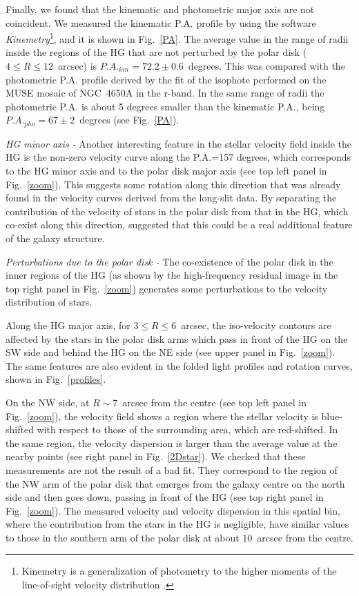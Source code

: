 \documentclass{aa}
\begin{document}
  Finally, we found that the kinematic and photometric major axis are
  not coincident.  We measured the kinematic P.A. profile by using the
  software {\it Kinemetry}\footnote{Kinemetry is a generalization of
    photometry to the higher moments of the line-of-sight velocity
    distribution \citep{Kraj2006}.}, and it is shown in
  Fig.~\ref{PA}. The average value in the range of radii inside the
  regions of the HG that are not perturbed by the polar disk
  ($4 \le R \le 12$~arcsec) is $P.A._{kin}=72.2 \pm 0.6$~degrees. This
  was compared with the photometric P.A. profile derived by the fit of
  the isophote performed on the MUSE mosaic of NGC~4650A in the r-band. In the same range of radii the photometric P.A. is about 5
  degrees smaller than the kinematic P.A., being
  $P.A._{pho}=67 \pm 2$~degrees (see Fig.~\ref{PA}).

 
{\it HG minor axis -} Another interesting feature in the stellar
velocity field inside the HG is the non-zero velocity curve along the
P.A.=157 degrees, which corresponds to the HG minor axis and to the
polar disk major axis (see top left panel in Fig.~\ref{zoom}). This
suggests some rotation along this direction that was  already found in the velocity curves derived from the long-slit data. 
By separating the contribution of the velocity of stars in the polar disk from that in the HG, which co-exist along this direction, \citet{Coccato2014} suggested that this could be a real additional feature of the galaxy structure.



{\it Perturbations due to the polar disk -} The co-existence of
the polar disk in the inner regions of the HG (as shown by the
high-frequency residual image in the top right panel in Fig.~\ref{zoom})
generates some perturbations to the velocity distribution of stars.

Along the HG major axis, for $3 \le R \le 6$~arcsec, the iso-velocity
contours are affected by the stars in the polar disk arms which pass in
front of the HG on the SW side and behind the HG on the NE side (see
upper panel in Fig.~\ref{zoom}). The same features are also evident in the
folded light profiles and rotation curves, shown in
Fig.~\ref{profiles}.

On the NW side, at $R \sim7$~arcsec from the centre (see top left
panel in Fig.~\ref{zoom}), the velocity field shows a region where the
stellar velocity is blue-shifted with respect to those of the
surrounding area, which are red-shifted. In the same region, the
velocity dispersion is larger than the average value at the nearby
points (see right panel in Fig.~\ref{2Dstar}). We checked that these
measurements are not the result of a bad fit. They correspond to the
region of the NW arm of the polar disk that emerges from the galaxy
centre on the north side and then  goes down, passing in front of the
HG (see top right panel in Fig.~\ref{zoom}). The measured velocity and
velocity dispersion in this spatial bin, where the contribution from
the stars in the HG is negligible, have similar values to those in the
southern arm of the polar disk at about 10~arcsec from the centre.
\end{document}
